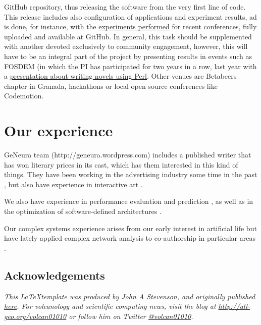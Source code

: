 \documentclass[a4paper,12pt,twocolumn]{article}
\begin{document}
\begin{itemize}
  GitHub repository, thus releasing the software from the very first
  line of code. This release includes also configuration of
  applications and experiment results, ad is done, for instance, with
  the
  \href{https://github.com/JJ/nodeo/tree/master/app/PPSN}{experiments
    performed} for recent conferences, fully uploaded and available at
    GitHub. In general, this task should be supplemented with another
  devoted exclusively to community engagement, however, this will have
  to be an integral part of the project by presenting results in
  events such as FOSDEM (in which the PI has participated for two years
  in a row, last year with a
  \href{https://www.youtube.com/watch?v=bhP9AFEoZ6o}{presentation
    about writing novels using Perl}. Other venues are Betabeers
  chapter in Granada, hackathons or local open source conferences like
  Codemotion.
\end{itemize}


\section{Our experience}
\label{sec:exp}

GeNeura team (http://geneura.wordpress.com) includes a published
writer that has won literary prices in its cast, which has them
interested in this kind of things. They have been working in the
advertising industry some time in the past
\cite{merelo:ecal97,AISB97}, but also have experience in interactive
art \cite{DBLP:conf/cec/TrujilloVVG13,DBLP:conf/cec/FernandesIBRG11}.


We also have experience in performance evaluation and prediction
\cite{castillo:evostar08,hardwareevo}, as well as in the optimization of
software-defined architectures \cite{gecco08:castillo}.

Our complex systems experience arises from our early interest in
artificial life \cite{ecal93} but have lately applied complex network
analysis to co-authorship in particular areas
\cite{ec-network-2007,merelo2013complex,DBLP:journals/corr/abs-1108-0261}. 

\subsection*{Acknowledgements}
\textit{This \LaTeX template was produced by John A Stevenson, and originally published \href{http://all-geo.org/volcan01010/2013/07/grant-applications-are-hard-work-includes-latex-template}{here}.  For volcanology and scientific computing news, visit the blog at \href{http://all-geo.org/volcan01010}{http://all-geo.org/volcan01010} or follow him on Twitter \href{https://twitter.com/volcan01010}{@volcan01010}.}
\end{document}

